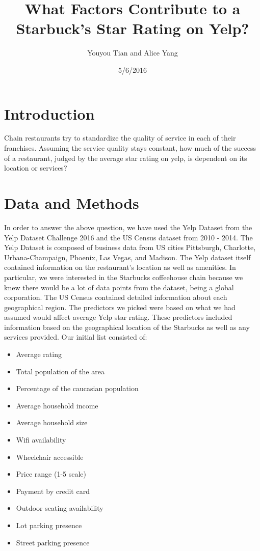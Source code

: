 \documentclass{article}
\title{What Factors Contribute to a Starbuck’s Star Rating on Yelp?}
\date{5/6/2016}
\author{Youyou Tian and Alice Yang}
\begin{document}
\maketitle{}
\begin{multicols}{2}

\section{Introduction}

	Chain restaurants try to standardize the quality of service in each of their franchises. Assuming the service quality stays constant, how much of the success of a restaurant, judged by the average star rating on yelp, is dependent on its location or services?

\section{Data and Methods}

	In order to answer the above question, we have used the Yelp Dataset from the Yelp Dataset Challenge 2016 and the US Census dataset from 2010 - 2014. The Yelp Dataset is composed of business data from US cities Pittsburgh, Charlotte, Urbana-Champaign, Phoenix, Las Vegas, and Madison. The Yelp dataset itself contained information on the restaurant’s location as well as amenities. In particular, we were interested in the Starbucks coffeehouse chain because we knew there would be a lot of data points from the dataset, being a global corporation. The US Census contained detailed information about each geographical region. The predictors we picked were based on what we had assumed would affect average Yelp star rating. These predictors included information based on the geographical location of the Starbucks as well as any services provided. Our initial list consisted of: 

\begin{itemize}[noitemsep,topsep=8pt,parsep=0pt,partopsep=0pt]
	\item Average rating
	\item Total population of the area
	\item Percentage of the caucasian population
	\item Average household income
	\item Average household size
	\item Wifi availability
	\item Wheelchair accessible
	\item Price range (1-5 scale)
	\item Payment by credit card
	\item Outdoor seating availability
	\item Lot parking presence
	\item Street parking presence
\end{itemize}


\end{multicols}
\end{document}
